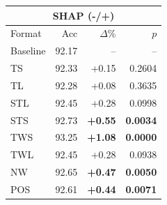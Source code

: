 \begin{tabular}{lrrr}
\toprule
\multicolumn{4}{c}{\textbf{SHAP (-/+)}} \\
\midrule
Format & Acc & $\Delta$\% & $p$ \\
\midrule
Baseline & 92.17 & -- & -- \\
\midrule
TS & 92.33 & +0.15 & 0.2604 \\
TL & 92.28 & +0.08 & 0.3635 \\
STL & 92.45 & +0.28 & 0.0998 \\
STS & 92.73 & \textbf{+0.55} & \textbf{0.0034} \\
TWS & 93.25 & \textbf{+1.08} & \textbf{0.0000} \\
TWL & 92.45 & +0.28 & 0.0938 \\
NW & 92.65 & \textbf{+0.47} & \textbf{0.0050} \\
POS & 92.61 & \textbf{+0.44} & \textbf{0.0071} \\
\bottomrule
\end{tabular}